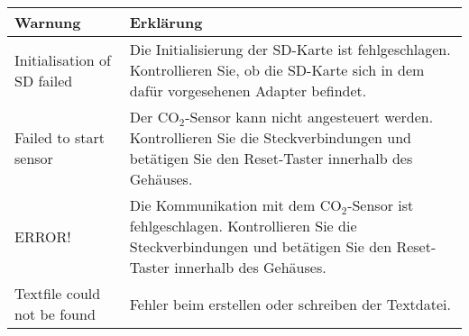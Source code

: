 \begin{table}[!hbt]
	\centering
	\begin{tabular}{|p{5cm}|p{11cm}|}
		
		\hline
		\rowcolor{lightgray} Warnung & Erklärung \\
		\hline
		Initialisation of SD failed & Die Initialisierung der SD-Karte ist fehlgeschlagen. Kontrollieren Sie, ob die SD-Karte sich in dem dafür vorgesehenen Adapter befindet. \\
		\hline
		Failed to start sensor & Der CO$_2$-Sensor kann nicht angesteuert werden. Kontrollieren Sie die Steckverbindungen und betätigen Sie den Reset-Taster innerhalb des Gehäuses. \\
		\hline
		ERROR! & Die Kommunikation mit dem CO$_2$-Sensor ist fehlgeschlagen. Kontrollieren Sie die Steckverbindungen und betätigen Sie den Reset-Taster innerhalb des Gehäuses. \\
		\hline
		Textfile could not be found & Fehler beim erstellen oder schreiben der Textdatei. \\
		\hline
		
	\end{tabular}
	\label{tab:Warnings}
\end{table}